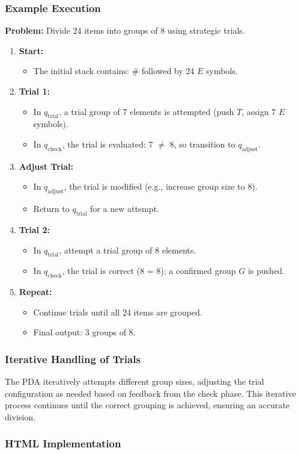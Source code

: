\documentclass[11pt]{article}
\begin{document}
\subsubsection*{Example Execution}
\textbf{Problem:} Divide 24 items into groups of 8 using strategic trials.
\begin{enumerate}
    \item \textbf{Start:}  
    \begin{itemize}
        \item The initial stack contains: \(\#\) followed by 24 \(E\) symbols.
    \end{itemize}
    \item \textbf{Trial 1:}  
    \begin{itemize}
        \item In \(q_{\text{trial}}\), a trial group of 7 elements is attempted (push \(T\), assign 7 \(E\) symbols).
        \item In \(q_{\text{check}}\), the trial is evaluated: 7 \(\neq\) 8, so transition to \(q_{\text{adjust}}\).
    \end{itemize}
    \item \textbf{Adjust Trial:}  
    \begin{itemize}
        \item In \(q_{\text{adjust}}\), the trial is modified (e.g., increase group size to 8).
        \item Return to \(q_{\text{trial}}\) for a new attempt.
    \end{itemize}
    \item \textbf{Trial 2:}  
    \begin{itemize}
        \item In \(q_{\text{trial}}\), attempt a trial group of 8 elements.
        \item In \(q_{\text{check}}\), the trial is correct (8 = 8); a confirmed group \(G\) is pushed.
    \end{itemize}
    \item \textbf{Repeat:}  
    \begin{itemize}
        \item Continue trials until all 24 items are grouped.
        \item Final output: 3 groups of 8.
    \end{itemize}
\end{enumerate}

\subsubsection*{Iterative Handling of Trials}
The PDA iteratively attempts different group sizes, adjusting the trial configuration as needed based on feedback from the check phase. This iterative process continues until the correct grouping is achieved, ensuring an accurate division.

\clearpage 

\subsubsection*{HTML Implementation}


\printbibliography
\end{document}
